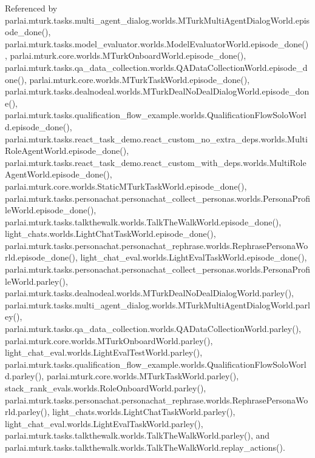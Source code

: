 Referenced by parlai.\+mturk.\+tasks.\+multi\+\_\+agent\+\_\+dialog.\+worlds.\+M\+Turk\+Multi\+Agent\+Dialog\+World.\+episode\+\_\+done(), parlai.\+mturk.\+tasks.\+model\+\_\+evaluator.\+worlds.\+Model\+Evaluator\+World.\+episode\+\_\+done(), parlai.\+mturk.\+core.\+worlds.\+M\+Turk\+Onboard\+World.\+episode\+\_\+done(), parlai.\+mturk.\+tasks.\+qa\+\_\+data\+\_\+collection.\+worlds.\+Q\+A\+Data\+Collection\+World.\+episode\+\_\+done(), parlai.\+mturk.\+core.\+worlds.\+M\+Turk\+Task\+World.\+episode\+\_\+done(), parlai.\+mturk.\+tasks.\+dealnodeal.\+worlds.\+M\+Turk\+Deal\+No\+Deal\+Dialog\+World.\+episode\+\_\+done(), parlai.\+mturk.\+tasks.\+qualification\+\_\+flow\+\_\+example.\+worlds.\+Qualification\+Flow\+Solo\+World.\+episode\+\_\+done(), parlai.\+mturk.\+tasks.\+react\+\_\+task\+\_\+demo.\+react\+\_\+custom\+\_\+no\+\_\+extra\+\_\+deps.\+worlds.\+Multi\+Role\+Agent\+World.\+episode\+\_\+done(), parlai.\+mturk.\+tasks.\+react\+\_\+task\+\_\+demo.\+react\+\_\+custom\+\_\+with\+\_\+deps.\+worlds.\+Multi\+Role\+Agent\+World.\+episode\+\_\+done(), parlai.\+mturk.\+core.\+worlds.\+Static\+M\+Turk\+Task\+World.\+episode\+\_\+done(), parlai.\+mturk.\+tasks.\+personachat.\+personachat\+\_\+collect\+\_\+personas.\+worlds.\+Persona\+Profile\+World.\+episode\+\_\+done(), parlai.\+mturk.\+tasks.\+talkthewalk.\+worlds.\+Talk\+The\+Walk\+World.\+episode\+\_\+done(), light\+\_\+chats.\+worlds.\+Light\+Chat\+Task\+World.\+episode\+\_\+done(), parlai.\+mturk.\+tasks.\+personachat.\+personachat\+\_\+rephrase.\+worlds.\+Rephrase\+Persona\+World.\+episode\+\_\+done(), light\+\_\+chat\+\_\+eval.\+worlds.\+Light\+Eval\+Task\+World.\+episode\+\_\+done(), parlai.\+mturk.\+tasks.\+personachat.\+personachat\+\_\+collect\+\_\+personas.\+worlds.\+Persona\+Profile\+World.\+parley(), parlai.\+mturk.\+tasks.\+dealnodeal.\+worlds.\+M\+Turk\+Deal\+No\+Deal\+Dialog\+World.\+parley(), parlai.\+mturk.\+tasks.\+multi\+\_\+agent\+\_\+dialog.\+worlds.\+M\+Turk\+Multi\+Agent\+Dialog\+World.\+parley(), parlai.\+mturk.\+tasks.\+qa\+\_\+data\+\_\+collection.\+worlds.\+Q\+A\+Data\+Collection\+World.\+parley(), parlai.\+mturk.\+core.\+worlds.\+M\+Turk\+Onboard\+World.\+parley(), light\+\_\+chat\+\_\+eval.\+worlds.\+Light\+Eval\+Test\+World.\+parley(), parlai.\+mturk.\+tasks.\+qualification\+\_\+flow\+\_\+example.\+worlds.\+Qualification\+Flow\+Solo\+World.\+parley(), parlai.\+mturk.\+core.\+worlds.\+M\+Turk\+Task\+World.\+parley(), stack\+\_\+rank\+\_\+evals.\+worlds.\+Role\+Onboard\+World.\+parley(), parlai.\+mturk.\+tasks.\+personachat.\+personachat\+\_\+rephrase.\+worlds.\+Rephrase\+Persona\+World.\+parley(), light\+\_\+chats.\+worlds.\+Light\+Chat\+Task\+World.\+parley(), light\+\_\+chat\+\_\+eval.\+worlds.\+Light\+Eval\+Task\+World.\+parley(), parlai.\+mturk.\+tasks.\+talkthewalk.\+worlds.\+Talk\+The\+Walk\+World.\+parley(), and parlai.\+mturk.\+tasks.\+talkthewalk.\+worlds.\+Talk\+The\+Walk\+World.\+replay\+\_\+actions().

